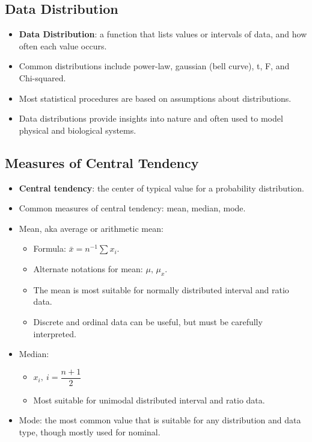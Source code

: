 \documentclass[12pt,a4paper]{article}
\begin{document}
\subsection{Data Distribution}
\begin{itemize}
    \item \textbf{Data Distribution}: a function that lists values or intervals of data, and how often each value occurs. 
    \item Common distributions include power-law, gaussian (bell curve), t, F, and Chi-squared.
    \item Most statistical procedures are based on assumptions about distributions.
    \item Data distributions provide insights into nature and often used to model physical and biological systems.
\end{itemize}

\subsection{Measures of Central Tendency}
\begin{itemize}
    \item \textbf{Central tendency}: the center of typical value for a probability distribution. 
    \item Common measures of central tendency: {\color{o-Sun}mean, median, mode}.
    \item Mean, aka average or arithmetic mean: 
    \begin{itemize}
        \item Formula: {\color{o-Sun}\(\bar{x}=n^{-1}\sum{x_i}\)}.
        \item Alternate notations for mean: \(\mu,\,\mu_x\).
        \item The mean is most suitable for normally distributed interval and ratio data.
        \item Discrete and ordinal data can be useful, but must be carefully interpreted.
    \end{itemize}
    \item Median:
        \begin{itemize}
            \item {\color{o-Sun}\(x_i,~i=\dfrac{n+1}{2}\)}
            \item Most suitable for unimodal distributed interval and ratio data.
        \end{itemize}
    \item Mode: the most common value that is suitable for any distribution and data type, though mostly used for nominal.
\end{itemize}
\end{document}

